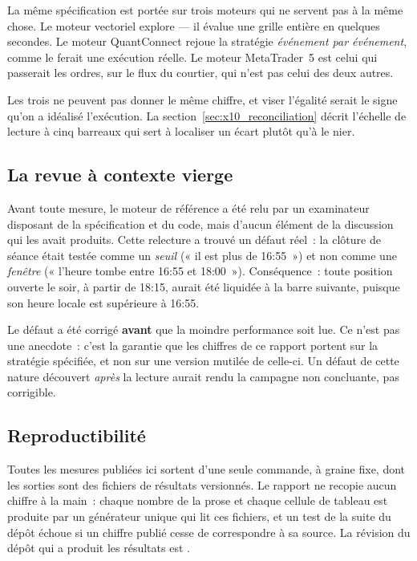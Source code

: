 La même spécification est portée sur trois moteurs qui ne servent pas à la
même chose. Le moteur vectoriel explore --- il évalue une grille entière en
quelques secondes. Le moteur QuantConnect rejoue la stratégie
\emph{événement par événement}, comme le ferait une exécution réelle. Le
moteur MetaTrader~5 est celui qui passerait les ordres, sur le flux du
courtier, qui n'est pas celui des deux autres.

Les trois ne peuvent pas donner le même chiffre, et viser l'égalité serait le
signe qu'on a idéalisé l'exécution. La section~\ref{sec:x10_reconciliation}
décrit l'échelle de lecture à cinq barreaux qui sert à localiser un écart
plutôt qu'à le nier.

\subsection{La revue à contexte vierge}

\begin{examplebox}[title=\textbf{\color{white}\textsf{Ce qu'une relecture indépendante a trouvé}}]
Avant toute mesure, le moteur de référence a été relu par un examinateur
disposant de la spécification et du code, mais d'aucun élément de la
discussion qui les avait produits. Cette relecture a trouvé un défaut réel~:
la clôture de séance était testée comme un \emph{seuil} (« il est plus de
16:55~») et non comme une \emph{fenêtre} (« l'heure tombe entre 16:55 et
18:00~»). Conséquence~: toute position ouverte le soir, à partir de 18:15,
aurait été liquidée à la barre suivante, puisque son heure locale est
supérieure à 16:55.

Le défaut a été corrigé \textbf{avant} que la moindre performance soit lue. Ce
n'est pas une anecdote~: c'est la garantie que les chiffres de ce rapport
portent sur la stratégie spécifiée, et non sur une version mutilée de
celle-ci. Un défaut de cette nature découvert \emph{après} la lecture aurait
rendu la campagne non concluante, pas corrigible.
\end{examplebox}

\subsection{Reproductibilité}

Toutes les mesures publiées ici sortent d'une seule commande, à graine fixe,
dont les sorties sont des fichiers de résultats versionnés. Le rapport ne
recopie aucun chiffre à la main~: chaque nombre de la prose et chaque cellule
de tableau est produite par un générateur unique qui lit ces fichiers, et un
test de la suite du dépôt échoue si un chiffre publié cesse de correspondre à
sa source. La révision du dépôt qui a produit les résultats est
\code{\XTenGitHead}.
